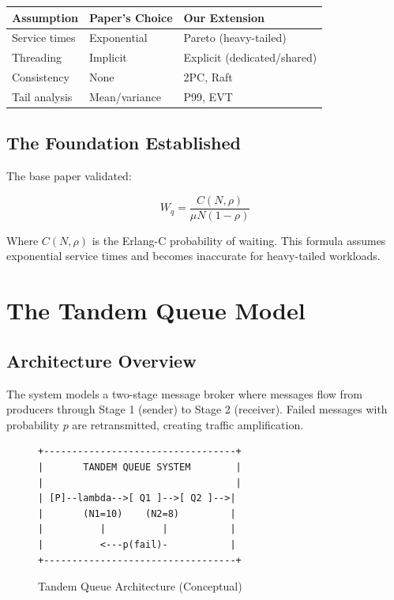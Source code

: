 \documentclass[11pt,a4paper]{article}
\begin{document}
\begin{center}
\begin{tabular}{lll}
\toprule
\textbf{Assumption} & \textbf{Paper's Choice} & \textbf{Our Extension} \\
\midrule
Service times & Exponential & Pareto (heavy-tailed) \\
Threading & Implicit & Explicit (dedicated/shared) \\
Consistency & None & 2PC, Raft \\
Tail analysis & Mean/variance & P99, EVT \\
\bottomrule
\end{tabular}
\end{center}

\subsection{The Foundation Established}

The base paper validated:

\begin{equation}
W_q = \frac{C(N, \rho)}{\mu N (1-\rho)}
\end{equation}

Where $C(N, \rho)$ is the Erlang-C probability of waiting. This formula assumes exponential service times and becomes inaccurate for heavy-tailed workloads.


\section{The Tandem Queue Model}

\subsection{Architecture Overview}

The system models a two-stage message broker where messages flow from producers through Stage 1 (sender) to Stage 2 (receiver). Failed messages with probability $p$ are retransmitted, creating traffic amplification.

\begin{figure}[h]
\centering
\footnotesize
\begin{verbatim}
+----------------------------------+
|       TANDEM QUEUE SYSTEM        |
|                                  |
| [P]--lambda-->[ Q1 ]-->[ Q2 ]-->|
|       (N1=10)    (N2=8)         |
|          |          |           |
|          <---p(fail)-           |
+----------------------------------+
\end{verbatim}
\caption{Tandem Queue Architecture (Conceptual)}
\label{fig:tandem_queue_concept}
\end{figure}
\end{document}
